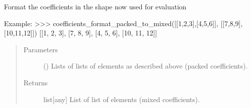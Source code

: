 \documentclass[letterpaper,10pt,english]{sphinxmanual}
\begin{document}
\begin{fulllineitems}
\label{\detokenize{coefficients_shapes:mermin_on_qiskit.coefficients_shapes.coefficients_format_packed_to_mixed}}
Format the coefficients in the shape now used for evaluation

Example:
\textgreater{}\textgreater{}\textgreater{}  coefficients\_format\_packed\_to\_mixed({[}{[}1,2,3{]},{[}4,5,6{]}{]}, {[}{[}7,8,9{]},{[}10,11,12{]}{]})                           
{[}{[}1, 2, 3{]}, {[}7, 8, 9{]}, {[}4, 5, 6{]}, {[}10, 11, 12{]}{]}
\begin{quote}\begin{description}
\item[{Parameters}] \leavevmode
{}\sphinxstyleliteralstrong{\sphinxupquote{, }} (\sphinxstyleliteralemphasis{\sphinxupquote{{[}}}\sphinxstyleliteralemphasis{\sphinxupquote{{[}}}\sphinxstyleliteralemphasis{\sphinxupquote{{]}}}\sphinxstyleliteralemphasis{\sphinxupquote{{]}}}) \textendash{} Lists of lists of 
elements as described above (packed coefficients).

\item[{Returns}] \leavevmode
list{[}any{]} \textendash{} List of list of elements (mixed coefficients).

\end{description}\end{quote}

\end{fulllineitems}

\end{document}
